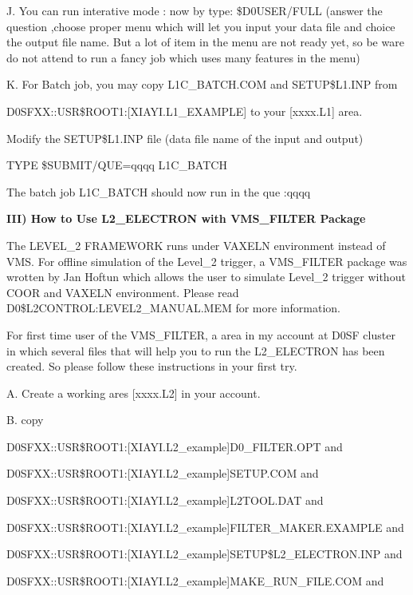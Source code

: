 \item{J.}  You can run interative mode :
    now by  type:   \$D0USER/FULL  (answer the question ,choose proper menu
    which will let you input your data file and choice the output file name.
    But a lot of item in the menu are not ready yet, so be ware do not 
    attend to run a fancy job which uses many features in the menu)

\item{K.}  For Batch job, you may copy L1C\_BATCH.COM and
     SETUP\$L1.INP  from

     D0SFXX::USR\$ROOT1:[XIAYI.L1\_EXAMPLE] to your [xxxx.L1] area.

    Modify the SETUP\$L1.INP file (data file name of the input and output)

    TYPE \$SUBMIT/QUE=qqqq   L1C\_BATCH

    The batch job L1C\_BATCH should now run in the que :qqqq

\vskip 0.4in
\+\bf III) How to Use L2\_ELECTRON with VMS\_FILTER Package\cr

The LEVEL\_2 FRAMEWORK runs under VAXELN environment instead of VMS. For 
offline simulation of the Level\_2 trigger, a VMS\_FILTER package 
was wrotten by
Jan Hoftun which allows the user to simulate Level\_2 trigger 
without COOR and
VAXELN environment. Please read D0\$L2CONTROL:LEVEL2\_MANUAL.MEM 
for more  information.

For first time user of the VMS\_FILTER, a area in my account 
at D0SF cluster
in which several files that will help you to run the L2\_ELECTRON has been 
created. So please follow these instructions in your first try.

\item{  A.} Create a working ares [xxxx.L2] in your account.

\item{  B.} copy 

    D0SFXX::USR\$ROOT1:[XIAYI.L2\_example]D0\_FILTER.OPT and
          
    D0SFXX::USR\$ROOT1:[XIAYI.L2\_example]SETUP.COM and
    
    D0SFXX::USR\$ROOT1:[XIAYI.L2\_example]L2TOOL.DAT and

     D0SFXX::USR\$ROOT1:[XIAYI.L2\_example]FILTER\_MAKER.EXAMPLE and

     D0SFXX::USR\$ROOT1:[XIAYI.L2\_example]SETUP\$L2\_ELECTRON.INP and

     D0SFXX::USR\$ROOT1:[XIAYI.L2\_example]MAKE\_RUN\_FILE.COM and

